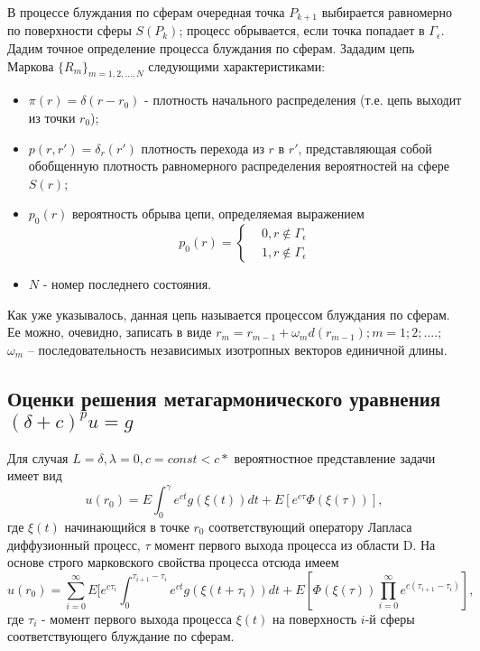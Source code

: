В процессе блуждания по сферам очередная точка $P_{k+1}$ выбирается равномерно по поверхности сферы $S(P_{k})$; процесс обрывается, если точка попадает в $ \Gamma_{\epsilon }$. Дадим точное определение процесса блуждания по сферам. Зададим цепь Маркова $\{R_{m}\}_{m=1,2,\dots,N} $ следующими характеристиками:\begin{itemize}
	\item $\pi (r) = \delta(r-r_{0})$ - плотность начального распределения (т.е. цепь выходит из точки $r_0$);
	\item $p(r,r') = \delta_{r}(r') $ плотность перехода из $r$ в $r'$, представляющая собой обобщенную плотность равномерного распределения вероятностей на сфере $S(r)$;
	\item $p_{0}(r)$ вероятность обрыва цепи, определяемая выражением \begin{equation} p_{0}(r)= 
	\left\{
\begin{aligned}
& 0, r \notin \Gamma_{\epsilon}\\ & 1, r\notin \Gamma_{\epsilon}
\end{aligned}
 \right. \end{equation}
\item{}$N$ - номер последнего состояния.
\end{itemize}
Как уже указывалось, данная цепь называется процессом блуждания по сферам. Ее можно, очевидно, записать в виде $r_{m} = r_{m-1} + \omega_{m}d(r_{m-1}); m = 1; 2;....;$
$\omega_{m}$ -- последовательность независимых изотропных векторов единичной
 длины.
\subsection{Оценки решения метагармонического уравнения$(\delta+c)^{p}u=g $}
Для случая $L=\delta, \lambda=0,c = const<c*$ вероятностное представление задачи имеет вид 
\begin{equation} u(r_{0})=E\int_{0}^{\gamma}e^{ct}g(\xi(t))dt+E[e^{c\tau}\Phi(\xi(\tau))],\end{equation}
где $\xi(t)$  начинающийся в точке $r_{0}$ соответствующий оператору Лапласа диффузионный процесс, $\tau $  момент первого выхода процесса из области D. На основе строго марковского свойства процесса отсюда имеем 
\begin{equation} u(r_{0})=\sum_{i=0}^{\infty} E [e^{c\tau_{i}} \int_{0}^{\tau_{i+1}-\tau_{i}}e^{ct}g(\xi(t+\tau_{i}))dt+E[\Phi(\xi(\tau)){}
\prod_{i=0}^{\infty}e^{c(\tau_{i+1}-\tau_{i})}],\end{equation}
где $ \tau_{i}$ - момент первого выхода процесса $\xi(t)$ на поверхность $i$-й сферы соответствующего блуждание по сферам.

